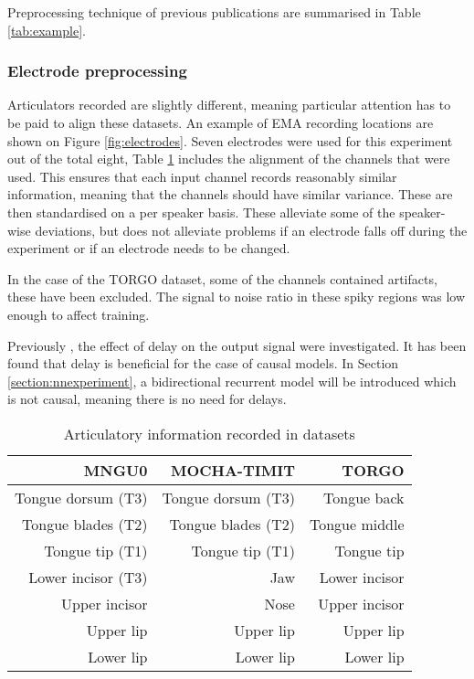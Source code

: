 \documentclass[a4paper]{article}
\begin{document}
Preprocessing technique of previous publications are summarised in Table \ref{tab:example}.
\subsubsection{Electrode preprocessing}

Articulators recorded are slightly different, meaning particular attention has to be paid to align these datasets. An example of EMA recording locations are shown on Figure \ref{fig:electrodes}. Seven electrodes were used for this experiment out of the total eight, Table \ref{tab:electrodes} includes
the alignment of the channels that were used. This ensures that each
input channel records reasonably similar information, meaning that the
channels should have similar variance. These are then standardised on a per speaker
basis. These alleviate some
of the speaker-wise deviations, but does not alleviate problems if an electrode
falls off during the experiment or if an electrode needs to be changed.

In the case of the TORGO dataset, some of the channels contained artifacts,
these have been excluded. The signal to noise
ratio in these spiky regions was low enough to affect
training.

Previously \cite{Gonzalez2016}, the effect of delay on the
output signal were investigated. It has been found that delay
is beneficial for the case of causal models. In Section \ref{section:nnexperiment},
a bidirectional recurrent model will be introduced which is not causal, meaning there is no need for delays.

\begin{table}[th]
  \caption{Articulatory information recorded in datasets}
  \label{tab:electrodes}
  \centering
  \begin{tabular}{ r r r  }
    \toprule
    \textbf{MNGU0} & \textbf{MOCHA-TIMIT} & \textbf{TORGO} \\ 
    \midrule
    Tongue dorsum (T3) & Tongue dorsum (T3) & Tongue back \\
    Tongue blades (T2) & Tongue blades (T2) & Tongue middle \\
    Tongue tip (T1) & Tongue tip (T1) & Tongue tip \\
    Lower incisor (T3) & Jaw & Lower incisor\\
    Upper incisor & Nose & Upper incisor\\
    Upper lip & Upper lip & Upper lip \\
    Lower lip & Lower lip  & Lower lip\\
    \bottomrule
    \end{tabular}
\end{table}
\end{document}
